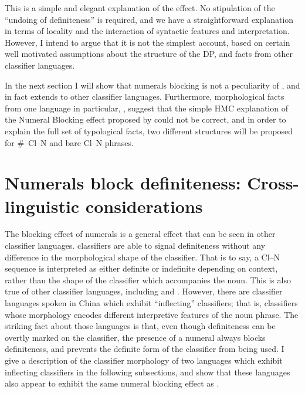 \documentclass[output=paper
,modfonts
,nonflat]{langsci/langscibook}
\begin{document}
This is a simple and elegant explanation of the  effect. No stipulation of the ``undoing of definiteness'' is required, and we have a straightforward explanation in terms of locality and the interaction of syntactic features and interpretation. However, I intend to argue that it is not the simplest account, based on certain well motivated assumptions about the structure of the DP, and facts from other classifier languages. 

In the next section I will show that numerals blocking  is not a peculiarity of , and in fact extends to other classifier languages. Furthermore, morphological facts from one language in particular, , suggest that the simple HMC explanation of the Numeral Blocking effect proposed by \citeauthor{Simpson2005} could not be correct, and in order to explain the full set of typological facts, two different structures will be proposed for \#--Cl--N and bare Cl--N phrases.

\section{Numerals block definiteness: Cross-linguistic considerations}

The blocking effect of numerals is a general effect that can be seen in other classifier languages.  classifiers are able to signal definiteness without any difference in the morphological shape of the classifier. That is to say, a Cl--N sequence is interpreted as either definite or indefinite depending on context, rather than the shape of the classifier which accompanies the noun. This is also true of other classifier languages, including  and . However, there are classifier languages spoken in China which exhibit ``inflecting'' classifiers; that is, classifiers whose morphology encodes different interpretive features of the noun phrase. The striking fact about those languages is that, even though definiteness can be overtly marked on the classifier, the presence of a numeral always blocks definiteness, and prevents the definite form of the classifier from being used. I give a description of the classifier morphology of two languages which exhibit inflecting classifiers in the following subsections, and show that these languages also appear to exhibit the same numeral blocking effect as .
\end{document}
